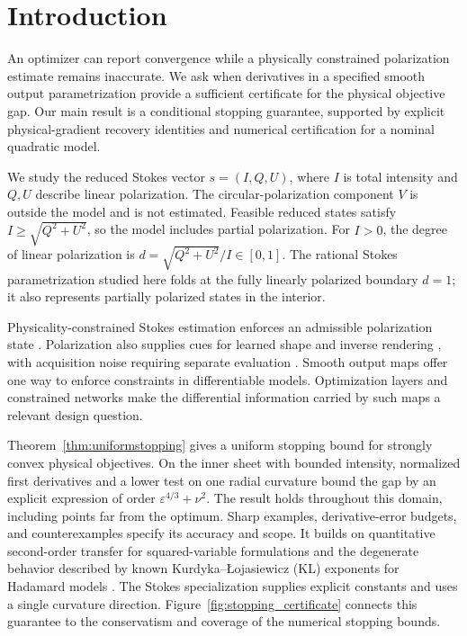 \documentclass[10pt,a4paper]{article}
\begin{document}
\section{Introduction}
\label{sec:intro}
An optimizer can report convergence while a physically constrained polarization estimate remains inaccurate. We ask when derivatives in a specified smooth output parametrization provide a sufficient certificate for the physical objective gap. Our main result is a conditional stopping guarantee, supported by explicit physical-gradient recovery identities and numerical certification for a nominal quadratic model.

We study the reduced Stokes vector $s=(I,Q,U)$, where $I$ is total intensity and $Q,U$ describe linear polarization. The circular-polarization component $V$ is outside the model and is not estimated. Feasible reduced states satisfy $I\geq\sqrt{Q^2+U^2}$, so the model includes partial polarization. For $I>0$, the degree of linear polarization is $d=\sqrt{Q^2+U^2}/I\in[0,1]$. The rational Stokes parametrization studied here folds at the fully linearly polarized boundary $d=1$; it also represents partially polarized states in the interior.

Physicality-constrained Stokes estimation enforces an admissible polarization state \cite{hu,spc,psara}. Polarization also supplies cues for learned shape and inverse rendering \cite{ba,pandora}, with acquisition noise requiring separate evaluation \cite{polarns}. Smooth output maps offer one way to enforce constraints in differentiable models. Optimization layers \cite{optnet,cvxlayers} and constrained networks \cite{hardnet} make the differential information carried by such maps a relevant design question.

Theorem~\ref{thm:uniformstopping} gives a uniform stopping bound for strongly convex physical objectives. On the inner sheet with bounded intensity, normalized first derivatives and a lower test on one radial curvature bound the gap by an explicit expression of order $\varepsilon^{4/3}+\nu^2$. The result holds throughout this domain, including points far from the optimum. Sharp examples, derivative-error budgets, and counterexamples specify its accuracy and scope. It builds on quantitative second-order transfer for squared-variable formulations \cite{dingwright} and the degenerate behavior described by known Kurdyka--\L{}ojasiewicz (KL) exponents for Hadamard models \cite{ouyang}. The Stokes specialization supplies explicit constants and uses a single curvature direction. Figure~\ref{fig:stopping_certificate} connects this guarantee to the conservatism and coverage of the numerical stopping bounds.
\end{document}
